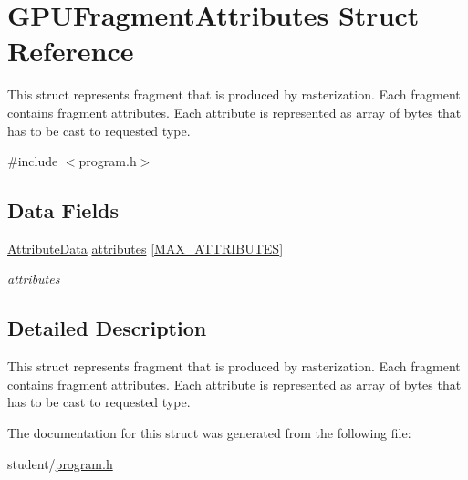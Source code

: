 \hypertarget{structGPUFragmentAttributes}{\section{G\-P\-U\-Fragment\-Attributes Struct Reference}
\label{structGPUFragmentAttributes}
}


This struct represents fragment that is produced by rasterization. Each fragment contains fragment attributes. Each attribute is represented as array of bytes that has to be cast to requested type.  




{\ttfamily \#include $<$program.\-h$>$}

\subsection*{Data Fields}
\begin{DoxyCompactItemize}
\item 
\hypertarget{structGPUFragmentAttributes_af2ea62c0bcd0c007607fecb9ca8f73d7}{\hyperlink{fwd_8h_aa9879a02fad39161594e48222b5d9660}{Attribute\-Data} \hyperlink{structGPUFragmentAttributes_af2ea62c0bcd0c007607fecb9ca8f73d7}{attributes} \mbox{[}\hyperlink{fwd_8h_a4d992a1f9192388588184753115f6c03}{M\-A\-X\-\_\-\-A\-T\-T\-R\-I\-B\-U\-T\-E\-S}\mbox{]}}\label{structGPUFragmentAttributes_af2ea62c0bcd0c007607fecb9ca8f73d7}

\begin{DoxyCompactList}\small\item\em attributes \end{DoxyCompactList}\end{DoxyCompactItemize}


\subsection{Detailed Description}
This struct represents fragment that is produced by rasterization. Each fragment contains fragment attributes. Each attribute is represented as array of bytes that has to be cast to requested type. 

The documentation for this struct was generated from the following file\-:\begin{DoxyCompactItemize}
\item 
student/\hyperlink{program_8h}{program.\-h}\end{DoxyCompactItemize}

